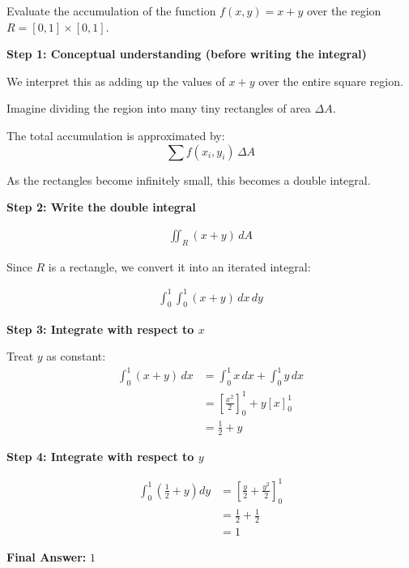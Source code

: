 \begin{examplebox}
    Evaluate the accumulation of the function $f(x,y)=x+y$ over the region $R=[0,1]\times[0,1]$.

    \textbf{Step 1: Conceptual understanding (before writing the integral)}

    We interpret this as adding up the values of $x+y$ over the entire square region.

    Imagine dividing the region into many tiny rectangles of area $\Delta A$.

    The total accumulation is approximated by:
    \begin{equation*}
        \sum f(x_i,y_i)\,\Delta A
    \end{equation*}

    As the rectangles become infinitely small, this becomes a double integral.

    \textbf{Step 2: Write the double integral}

    \begin{align*}
        \iint_R (x+y)\, dA
    \end{align*}

    Since $R$ is a rectangle, we convert it into an iterated integral:

    \begin{align*}
        \int_0^1 \int_0^1 (x+y)\, dx\, dy
    \end{align*}

    \textbf{Step 3: Integrate with respect to $x$}

    Treat $y$ as constant:
    \begin{align*}
        \int_0^1 (x+y)\, dx
         & = \int_0^1 x\,dx + \int_0^1 y\,dx           \\
         & = \left[\frac{x^2}{2}\right]_0^1 + y[x]_0^1 \\
         & = \frac{1}{2} + y
    \end{align*}

    \textbf{Step 4: Integrate with respect to $y$}

    \begin{align*}
        \int_0^1 \left(\frac{1}{2} + y\right) dy
         & = \left[\frac{y}{2} + \frac{y^2}{2}\right]_0^1 \\
         & = \frac{1}{2} + \frac{1}{2}                    \\
         & = 1
    \end{align*}

    \textbf{Final Answer:} $\boxed{1}$
\end{examplebox}

